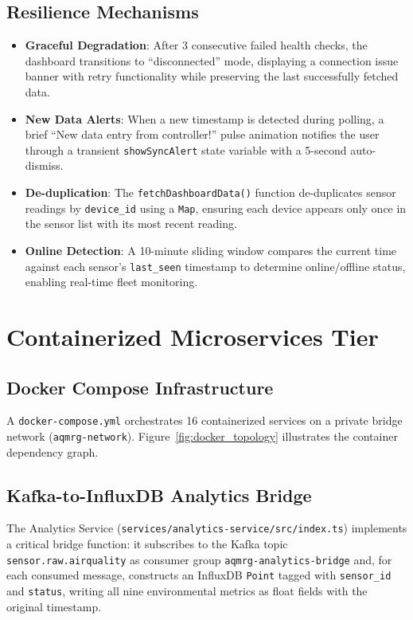 \figMethodologyMitigation

\subsection{Resilience Mechanisms}
\begin{itemize}[nosep]
    \item \textbf{Graceful Degradation}: After 3 consecutive failed health checks, the dashboard transitions to ``disconnected'' mode, displaying a connection issue banner with retry functionality while preserving the last successfully fetched data.
    \item \textbf{New Data Alerts}: When a new timestamp is detected during polling, a brief ``New data entry from controller!'' pulse animation notifies the user through a transient \texttt{showSyncAlert} state variable with a 5-second auto-dismiss.
    \item \textbf{De-duplication}: The \texttt{fetchDashboardData()} function de-duplicates sensor readings by \texttt{device\_id} using a \texttt{Map}, ensuring each device appears only once in the sensor list with its most recent reading.
    \item \textbf{Online Detection}: A 10-minute sliding window compares the current time against each sensor's \texttt{last\_seen} timestamp to determine online/offline status, enabling real-time fleet monitoring.
\end{itemize}

\section{Containerized Microservices Tier}

\subsection{Docker Compose Infrastructure}
A \texttt{docker-compose.yml} orchestrates 16 containerized services on a private bridge network (\texttt{aqmrg-network}). Figure~\ref{fig:docker_topology} illustrates the container dependency graph.

\figMethodologyDockerTopology

\tabMethodologyDocker

\subsection{Kafka-to-InfluxDB Analytics Bridge}
The Analytics Service (\texttt{services/analytics-service/src/index.ts}) implements a critical bridge function: it subscribes to the Kafka topic \texttt{sensor.raw.airquality} as consumer group \texttt{aqmrg-analytics-bridge} and, for each consumed message, constructs an InfluxDB \texttt{Point} tagged with \texttt{sensor\_id} and \texttt{status}, writing all nine environmental metrics as float fields with the original timestamp.


